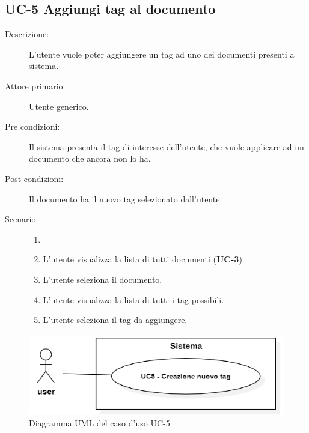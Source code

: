 \subsection{UC-5 Aggiungi tag al documento}
\begin{description}
    \item[Descrizione:] L’utente vuole poter aggiungere un tag ad uno dei documenti presenti a sistema.
    \item[Attore primario:] Utente generico.
    \item[Pre condizioni:] Il sistema presenta il tag di interesse dell'utente, che vuole applicare ad un documento che ancora non lo ha.
    \item[Post condizioni:] Il documento ha il nuovo tag selezionato dall’utente.
    \item[Scenario:]
    \begin{enumerate}
        \item[]
        \item L’utente visualizza la lista di tutti documenti (\textbf{UC-3}).
        \item L'utente seleziona il documento.
        \item L’utente visualizza la lista di tutti i tag possibili.
        \item L’utente seleziona il tag da aggiungere.
    \end{enumerate}
\end{description}

\begin{figure}[H]
    \centering
    \includegraphics[width=0.8\linewidth]{UC5.png} %
    \caption{Diagramma UML del caso d'uso UC-5}
    \label{fig:UC5}
\end{figure}

